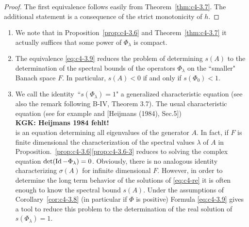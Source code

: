 
\begin{proof}
The first equivalence follows easily from Theorem~\ref{thm:c4-3.7}. 
The additional statement is a consequence of the strict monotonicity of $h$.
\end{proof}

\begin{remarks*}\label{rem:c4-3.0-kgk}
\begin{enumerate}[1.]
\item \label{rem:c4-3.1-1}
We note that in Proposition~\ref{prop:c4-3.6} and Theorem~\ref{thm:c4-3.7} it actually suffices that some power of $\Phi_{\lambda}$ is compact.
\item \label{rem:c4-3.1-2}
The equivalence \eqref{eq:c4-3.9} reduces the problem of determining $s(A)$ to the determination of the spectral bounds of the operators $\Phi_{\lambda}$ on the ``smaller" Banach space $F$.
In particular, $s(A) < 0$ if and only if $s(\Phi_{0}) < 1$.
\item \label{rem:c4-3.1-3}
We call the identity\, ``$s(\Phi_{\lambda}) = 1$" a generalized characteristic equation (see also the remark following B-IV, Theorem 3.7). The usual characteristic equation (see for example  \citet[p.168ff]{hale:1977} and [Heijmans (1984), Sec.5]) 
\\ \textbf{KGK: Heijmans 1984 fehlt!}\\
is an equation determining all eigenvalues of the generator $A$. 
In fact, if $F$ is finite dimensional the characterization of the spectral values $\lambda$ of $A$ in Proposition.~\ref{prop:c4-3.6}\ref{prop:c4-3.6-3} reduces to solving the complex equation $\det(\operatorname{Id} - \Phi_{\lambda}) = 0$. 
Obviously, there is no analogous identity characterizing $\sigma(A)$ for infinite dimensional $F$. 
However, in order to determine the long term behavior of the solutions of \eqref{eq:c4-re} it is often enough to know the spectral bound $s(A)$. 
Under the assumptions of Corollary~\ref{cor:c4-3.8} (in particular if $\Phi$ is positive) Formula \eqref{eq:c4-3.9} gives a tool to reduce this problem to the determination of the real solution of $s(\Phi_{\lambda}) = 1$.
\end{enumerate}
\end{remarks*}
